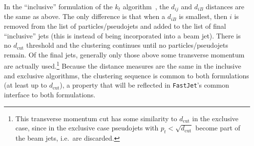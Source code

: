 \documentclass[12pt,a4]{article}
\newcommand{\fastjet}{\texttt{FastJet}\xspace}
\begin{document}
In the ``inclusive'' formulation of the $k_t$ algorithm~\cite{ktincl},
the $d_{ij}$ and $d_{iB}$ distances are the same as above.
%
The only difference is that when a $d_{iB}$ is smallest, then $i$ is
removed from the list of particles/pseudojets and added to the list of
final ``inclusive'' jets (this is instead of being incorporated into a
beam jet).
%
There is no $d_{\text{cut}}$ threshold and the clustering continues
until no particles/pseudojets remain.
%
Of the final jets, generally only those above some transverse momentum
are actually used.\footnote{This transverse momentum cut has some
  similarity to $d_{\text{cut}}$ in the exclusive case, since in the
  exclusive case pseudojets with $p_t < \sqrt{d_{\text{cut}}}$ become
  part of the beam jets, i.e.\ are discarded.}
%
Because the distance measures are the same in the inclusive and
exclusive algorithms, the clustering sequence is common to both
formulations (at least up to $d_{\text{cut}}$), a property that will
be reflected in \fastjet's common interface to both formulations.
\end{document}
